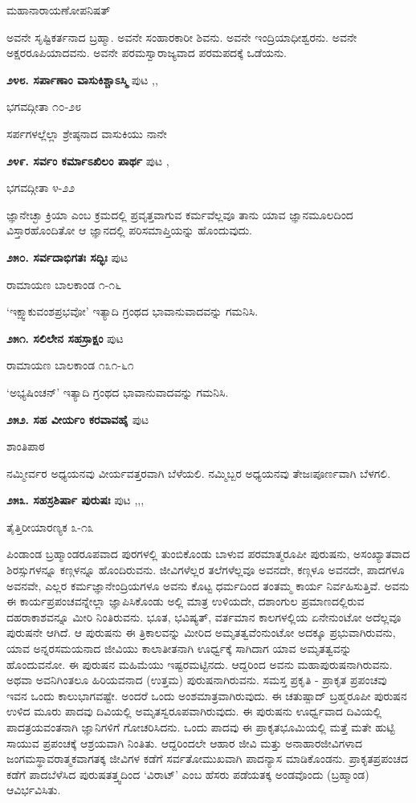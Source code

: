 {\hfill ಮಹಾನಾರಾಯಣೋಪನಿಷತ್

ಅವನೇ ಸೃಷ್ಟಿಕರ್ತನಾದ ಬ್ರಹ್ಮಾ. ಅವನೇ ಸಂಹಾರಕಾರೀ ಶಿವನು. ಅವನೇ ಇಂದ್ರಿಯಾಧೀಶ್ವರನು. ಅವನೇ ಅಕ್ಷರರೂಪಿಯಾದವನು. ಅವನೇ ಪರಮಸ್ವಾರಾಜ್ಯವಾದ ಪರಮಪದಕ್ಕೆ ಒಡೆಯನು. 

\medskip
\noindent\textbf{೨೪೮. ಸರ್ಪಾಣಾಂ ವಾಸುಕಿಶ್ಚಾಽಸ್ಮಿ} \hfill ಪುಟ \pageref{93},\pageref{95},\pageref{98}

\hfill ಭಗವದ್ಗೀತಾ ೧೦-೨೮

ಸರ್ಪಗಳಲ್ಲೆಲ್ಲಾ ಶ್ರೇಷ್ಠನಾದ ವಾಸುಕಿಯು ನಾನೇ

\medskip
\noindent\textbf{೨೪೯. ಸರ್ವಂ ಕರ್ಮಾಽಖಿಲಂ ಪಾರ್ಥ} \hfill ಪುಟ \pageref{98},\pageref{78}

\hfill ಭಗವದ್ಗೀತಾ ೪-೨೨

ಜ್ಞಾನೇಚ್ಛಾ ಕ್ರಿಯಾ ಎಂಬ ಕ್ರಮದಲ್ಲಿ ಪ್ರವೃತ್ತವಾಗುವ ಕರ್ಮವೆಲ್ಲವೂ ತಾನು ಯಾವ ಜ್ಞಾನಮೂಲದಿಂದ ವಿಸ್ತಾರಹೊಂದಿತೋ ಆ ಜ್ಞಾನದಲ್ಲಿ ಪರಿಸಮಾಪ್ತಿಯನ್ನು ಹೊಂದುವುದು.

\medskip
\noindent\textbf{೨೫೦. ಸರ್ವದಾಭಿಗತಃ ಸದ್ಭಿಃ} \hfill ಪುಟ \pageref{247}

\hfill ರಾಮಾಯಣ ಬಾಲಕಾಂಡ ೧-೧೬

`ಇಕ್ಷ್ವಾಕುವಂಶಪ್ರಭವೋ' ಇತ್ಯಾದಿ ಗ್ರಂಥದ ಭಾವಾನುವಾದವನ್ನು ಗಮನಿಸಿ.

\medskip
\noindent\textbf{೨೫೧. ಸಲಿಲೇನ ಸಹಸ್ರಾಕ್ಷಂ} \hfill ಪುಟ \pageref{248}

\hfill ರಾಮಾಯಣ ಬಾಲಕಾಂಡ ೧೩೧-೬೧

`ಅಭ್ಯಷಿಂಚನ್' ಇತ್ಯಾದಿ ಗ್ರಂಥದ ಭಾವಾನುವಾದವನ್ನು ಗಮನಿಸಿ.

\medskip
\noindent\textbf{೨೫೨. ಸಹ ವೀರ್ಯಂ ಕರವಾವಹೈ} \hfill ಪುಟ \pageref{130}

\hfill ಶಾಂತಿಪಾಠ

ನಮ್ಮೀರ್ವರ ಅಧ್ಯಯನವು ವೀರ್ಯವತ್ತರವಾಗಿ ಬೆಳೆಯಲಿ. ನಮ್ಮಿಬ್ಬರ ಅಧ್ಯಯನವು ತೇಜಃಪೂರ್ಣವಾಗಿ ಬೆಳಗಲಿ.

\medskip
\noindent\textbf{೨೫೩. ಸಹಸ್ರಶಿರ್ಷಾ ಪುರುಷಃ} \hfill ಪುಟ \pageref{108},\pageref{150},\pageref{218},\pageref{249}

\hfill ತೈತ್ತಿರೀಯಾರಣ್ಯಕ ೩-೧೩

ಪಿಂಡಾಂಡ ಬ್ರಹ್ಮಾಂಡರೂಪವಾದ ಪುರಗಳಲ್ಲಿ ತುಂಬಿಕೊಂಡು ಬಾಳುವ ಪರಮಾತ್ಮರೂಪೀ ಪುರುಷನು, ಅಸಂಖ್ಯಾತವಾದ ಶಿರಸ್ಸುಗಳನ್ನೂ ಕಣ್ಗಳನ್ನೂ ಹೊಂದಿರುವನು. ಜೀವಿಗಳೆಲ್ಲರ ತಲೆಗಳೆಲ್ಲವೂ ಅವನದೇ, ಕಣ್ಗಳೂ ಅವನದೇ, ಪಾದಗಳೂ ಅವನವೇ, ಎಲ್ಲರ ಕರ್ಮಜ್ಞಾನೇಂದ್ರಿಯಗಳೂ ಅವನು ಕೊಟ್ಟ ಧರ್ಮದಿಂದ ತಂತಮ್ಮ ಕಾರ್ಯ ನಿರ್ವಹಿಸುತ್ತಿವೆ. ಅವನು ಈ ಕಾರ್ಯಪ್ರಪಂಚವನ್ನೇಲ್ಲಾ ಜ್ಞಾಪಿಸಿಕೊಂಡು ಅಲ್ಲಿ ಮಾತ್ರ ಉಳಿಯದೇ, ದಶಾಂಗುಲ ಪ್ರಮಾಣದಲ್ಲಿರುವ ದಹರಾಕಾಶವನ್ನೂ ಮೀರಿ ನಿಂತಿರುವನು. ಭೂತ, ಭವಿಷ್ಯತ್, ವರ್ತಮಾನ ಕಾಲಗಳಲ್ಲಿಯ ಏನೇನುಂಟೋ ಅದೆಲ್ಲವೂ ಪುರುಷನೇ ಆಗಿದೆ. ಆ ಪುರುಷನು ಈ ತ್ರಿಕಾಲವನ್ನು ಮೀರಿದ ಅಮೃತತ್ವವೆಂನುಂಟೋ ಅದಕ್ಕೂ ಪ್ರಭುವಾಗಿರುವನು, ಯಾವ ಅನ್ನರಸಮಯನಾದ ಜೀವಿಯು ಕಾಲಾತೀತನಾಗಿ ಊರ್ಧ್ವಕ್ಕೆ ಸಾಗಿದಾಗ ಯಾವ ಅಮೃತತ್ವವನ್ನು ಹೊಂದುವನೋ. ಈ ಪುರುಷನ ಮಹಿಮೆಯು ಇಷ್ಟರಮಟ್ಟಿನದು. ಆದ್ದರಿಂದ ಅವನು ಮಹಾಪುರುಷನಾಗಿರುವನು. ಅಥವಾ ಅವನಿಗಿಂತಲೂ ಹಿರಿಯವನಾದ (ಉತ್ತಮ) ಪುರುಷನಾಗಿರುವನು. ಸಮಸ್ತ ಪ್ರಕೃತಿ - ಪ್ರಾಕೃತ ಪ್ರಪಂಚವು ಇವನ ಒಂದು ಕಾಲುಭಾಗವಷ್ಟೇ. ಅಂದರೆ ಒಂದು ಅಂಶಮಾತ್ರವಾಗಿರುವುದು. ಈ ಚತುಷ್ಪಾದ್ ಬ್ರಹ್ಮರೂಪೀ ಪುರುಷನ ಉಳಿದ ಮೂರು ಪಾದವು ದಿವಿಯಲ್ಲಿ ಅಮೃತಸ್ವರೂಪವಾಗಿರುವುದು. ಈ ಪುರುಷನು ಊರ್ಧ್ವವಾದ ದಿವಿಯಲ್ಲಿ ಪಾದತ್ರಯವಂತನಾಗಿ ಜ್ಞಾನಿಗಳಿಗೆ ಗೋಚರಿಸಿದನು. ಒಂದು ಪಾದವು ಈ ಪ್ರಾಕೃತಭೂಮಿಯಲ್ಲಿ ಮತ್ತೆ ಮತೇ ಹುಟ್ಟಿ ಸಾಯುವ ಪ್ರಪಂಚಕ್ಕೆ ಆಶ್ರಯವಾಗಿ ನಿಂತಿತು. ಆದ್ದರಿಂದಲೇ ಆಹಾರ ಜೀವಿ ಮತ್ತು ಅನಾಹಾರಜೀವಿಗಳಾದ ಜಂಗಮಸ್ಥಾವರಾತ್ಮಕವಾಗತಕ್ಕ ಜೀವಿಗಳ ಕಡೆಗೆ ಸರ್ವತೋಮುಖವಾಗಿ ಪಾದನ್ಯಾಸ ಮಾಡಿಕೊಂಡನು. ಪ್ರಾಕೃತಪ್ರಪಂಚದ ಕಡೆಗೆ ಪಾದಬೆಳೆಸಿದ ಪುರುಷತತ್ತ್ವದಿಂದ `ವಿರಾಟ್' ಎಂಬ ಹೆಸರು ಪಡೆಯತಕ್ಕ ಅಂಡವೊಂದು (ಬ್ರಹ್ಮಾಂಡ) ಆವಿರ್ಭವಿಸಿತು.

}
